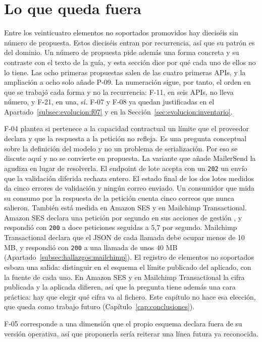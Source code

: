 \section{Lo que queda fuera}
\label{sec:evolucion:fuera}

Entre los veinticuatro elementos no soportados promovidos hay dieciséis sin número de propuesta.
Estos dieciséis entran por recurrencia, así que su patrón es del dominio.
Un número de propuesta pide además una forma concreta y su contraste con el texto de la guía, y esta sección dice por qué cada uno de ellos no lo tiene.
Las ocho primeras propuestas salen de las cuatro primeras APIs, y la ampliación a ocho solo añade P-09.
La numeración sigue, por tanto, el orden en que se trabajó cada forma y no la recurrencia: F-11, en seis APIs, no lleva número, y F-21, en una, sí.
F-07 y F-08 ya quedan justificadas en el Apartado~\ref{subsec:evolucion:f07} y en la Sección~\ref{sec:evolucion:inventario}.

F-04 plantea si pertenece a la capacidad contractual un límite que el proveedor declara y que la respuesta a la petición no refleja.
Es una pregunta conceptual sobre la definición del modelo y no un problema de serialización.
Por eso se discute aquí y no se convierte en propuesta.
La variante que añade MailerSend la agudiza en lugar de resolverla.
El endpoint de lote acepta con un \texttt{202} un envío que la validación diferida rechaza entero.
El estado final de los dos lotes medidos da cinco errores de validación y ningún correo enviado.
Un consumidor que mida su consumo por la respuesta de la petición cuenta cinco correos que nunca salieron.
También está medida en Amazon SES y en Mailchimp Transactional.
Amazon SES declara una petición por segundo en sus acciones de gestión \citep{sesdocs}, y respondió con \texttt{200} a doce peticiones seguidas a 5,7 por segundo.
Mailchimp Transactional declara que el JSON de cada llamada debe ocupar menos de 10 MB, y respondió con \texttt{200} a una llamada de unos 40 MB (Apartado~\ref{subsec:hallazgos:mailchimp}).
El registro de elementos no soportados esboza una salida: distinguir en el esquema el límite publicado del aplicado, con la fuente de cada uno.
En Amazon SES y en Mailchimp Transactional la cifra publicada y la aplicada difieren, así que la pregunta tiene además una cara práctica: hay que elegir qué cifra va al fichero.
Este capítulo no hace esa elección, que queda como trabajo futuro (Capítulo~\ref{cap:conclusiones}).

F-05 corresponde a una dimensión que el propio esquema declara fuera de su versión operativa, así que proponerla sería reiterar una línea futura ya reconocida.

